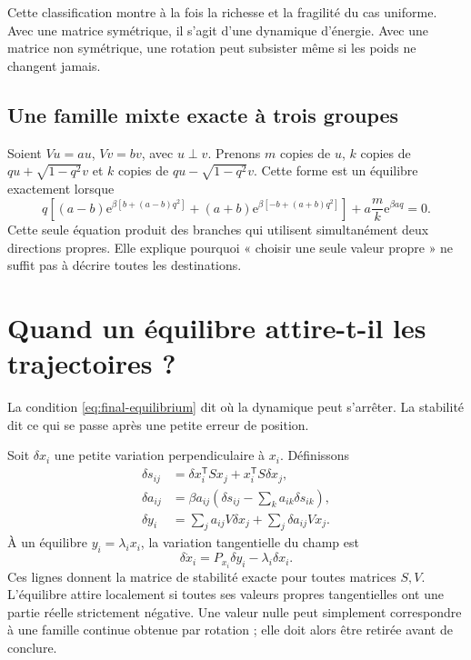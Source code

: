 \documentclass[11pt,a4paper]{article}
\theoremstyle{definition}
\newcommand{\e}{\mathrm e}
\newcommand{\T}{\mathsf T}
\begin{document}
Cette classification montre à la fois la richesse et la fragilité du cas uniforme. Avec
une matrice symétrique, il s'agit d'une dynamique d'énergie. Avec une matrice non
symétrique, une rotation peut subsister même si les poids ne changent jamais.

\subsection{Une famille mixte exacte à trois groupes}

Soient $Vu=au$, $Vv=bv$, avec $u\perp v$. Prenons $m$ copies de $u$, $k$ copies de
$qu+\sqrt{1-q^2}v$ et $k$ copies de $qu-\sqrt{1-q^2}v$. Cette forme est un équilibre
exactement lorsque
\begin{equation}
\boxed{
q\left[(a-b)\e^{\beta[b+(a-b)q^2]}
 +(a+b)\e^{\beta[-b+(a+b)q^2]}\right]
 +a\frac{m}{k}\e^{\beta aq}=0.}                           \label{eq:mixed-family}
\end{equation}
Cette seule équation produit des branches qui utilisent simultanément deux directions
propres. Elle explique pourquoi « choisir une seule valeur propre » ne suffit pas à
décrire toutes les destinations.

\section{Quand un équilibre attire-t-il les trajectoires ?}
\label{sec:stability}

La condition \eqref{eq:final-equilibrium} dit où la dynamique peut s'arrêter. La
stabilité dit ce qui se passe après une petite erreur de position.

Soit $\delta x_i$ une petite variation perpendiculaire à $x_i$. Définissons
\begin{align}
 \delta s_{ij}
 &=\delta x_i^{\T}Sx_j+x_i^{\T}S\delta x_j,\\
 \delta a_{ij}
 &=\beta a_{ij}\left(\delta s_{ij}-\sum_k a_{ik}\delta s_{ik}\right),\\
 \delta y_i
 &=\sum_j a_{ij}V\delta x_j+\sum_j\delta a_{ij}Vx_j.       \label{eq:variations}
\end{align}
À un équilibre $y_i=\lambda_i x_i$, la variation tangentielle du champ est
\begin{equation}
 \boxed{\quad \delta\dot x_i=P_{x_i}\delta y_i-\lambda_i\delta x_i.\quad}
                                                                    \label{eq:tangent-jacobian}
\end{equation}
Ces lignes donnent la matrice de stabilité exacte pour toutes matrices $S,V$. L'équilibre
attire localement si toutes ses valeurs propres tangentielles ont une partie réelle
strictement négative. Une valeur nulle peut simplement correspondre à une famille
continue obtenue par rotation ; elle doit alors être retirée avant de conclure.
\end{document}
